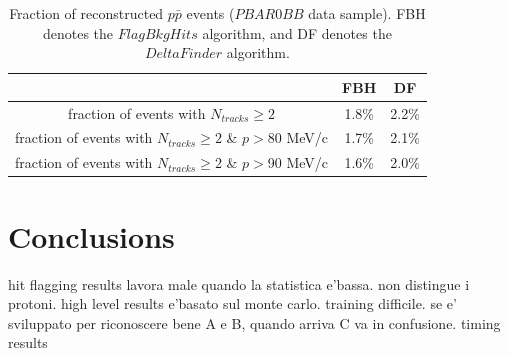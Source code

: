 \begin{center}
        \begin{table}[h!]
        \centering
        \renewcommand{\arraystretch}{1.}
        \begin{tabular}{| c | c | c |} 
            \hline
            &  FBH & DF\\
            \hline
            fraction of events with $N_{tracks} \geq 2$ &  1.8\% & 2.2\%\\
            \hline
            fraction of events with $N_{tracks} \geq 2$ \& $p>$80 MeV/c & 1.7\% & 2.1\%\\
            \hline
            fraction of events with $N_{tracks} \geq 2$ \& $p>$90 MeV/c & 1.6\% & 2.0\%\\
            \hline
            \end{tabular}
        \caption[Fraction of reconstructed $p\bar{p}$ events.]{Fraction of reconstructed $p\bar{p}$ events 
        ($PBAR0BB$ data sample). FBH denotes the $FlagBkgHits$ algorithm, 
        and DF denotes the $DeltaFinder$ algorithm.}
        \end{table}\label{tab:recoeffpbar}
\end{center}

\section{Conclusions}
hit flagging results
lavora male quando la statistica e'bassa. 
non distingue i protoni.
high level results
e'basato sul monte carlo. training difficile. se e' sviluppato per 
riconoscere bene A e B, quando arriva C va in confusione. 
timing results